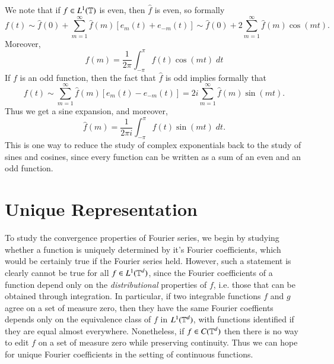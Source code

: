 \begin{remark}
    We note that if $f \in L^1(\operatorname{\mathbb{T}})$ is even, then $\widehat{f}$ is even, so formally
    \[ f(t) \sim \widehat{f}(0) + \sum_{m = 1}^\infty \widehat{f}(m) [e_m(t) + e_{-m}(t)] \sim \widehat{f}(0) + 2 \sum_{m = 1}^\infty \widehat{f}(m) \cos(mt). \]
    Moreover,
    \[ \widehat{f}(m) = \frac{1}{2\pi} \int_{-\pi}^\pi f(t) \cos(mt)\; dt \]
    If $f$ is an odd function, then the fact that $\widehat{f}$ is odd implies formally that
    \[ f(t) \sim \sum_{m = 1}^\infty \widehat{f}(m) [e_m(t) - e_{-m}(t)] = 2i \sum_{m = 1}^\infty \widehat{f}(m) \sin(mt). \]
    Thus we get a sine expansion, and moreover,
    \[ \widehat{f}(m) = \frac{1}{2\pi i} \int_{-\pi}^\pi f(t) \sin(mt)\; dt. \]
    This is one way to reduce the study of complex exponentials back to the study of sines and cosines, since every function can be written as a sum of an even and an odd function.
\end{remark}

\section{Unique Representation}

To study the convergence properties of Fourier series, we begin by studying whether a function is uniquely determined by it's Fourier coefficients, which would be certainly true if the Fourier series held. However, such a statement is clearly cannot be true for all $f \in L^1(\operatorname{\mathbb{T}}^d)$, since the Fourier coefficients of a function depend only on the \emph{distributional} properties of $f$, i.e. those that can be obtained through integration. In particular, if two integrable functions $f$ and $g$ agree on a set of measure zero, then they have the same Fourier coeffients depends only on the equivalence class of $f$ in $L^1(\operatorname{\mathbb{T}}^d)$, with functions identified if they are equal almost everywhere. Nonetheless, if $f \in C(\operatorname{\mathbb{T}}^d)$ then there is no way to edit $f$ on a set of measure zero while preserving continuity. Thus we can hope for unique Fourier coefficients in the setting of continuous functions.

